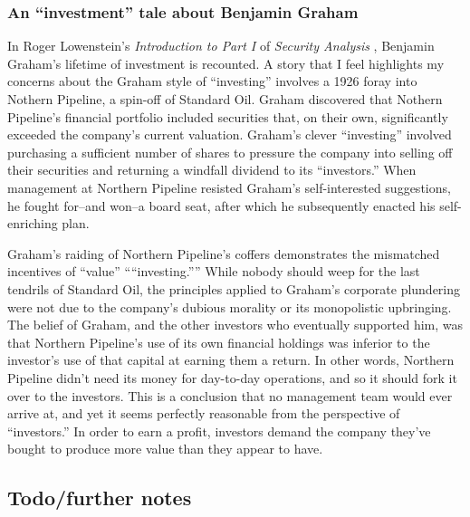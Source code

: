 \subsubsection{An ``investment'' tale about Benjamin Graham}

In Roger Lowenstein's {\it Introduction to Part I} of {\it Security Analysis} \cite{Graham2023}, Benjamin Graham's lifetime of investment is recounted.  A story that I feel highlights my concerns about the Graham style of ``investing'' involves a 1926 foray into Nothern Pipeline, a spin-off of Standard Oil.  Graham discovered that Nothern Pipeline's financial portfolio included securities that, on their own, significantly exceeded the company's current valuation.  Graham's clever ``investing'' involved purchasing a sufficient number of shares to pressure the company into selling off their securities and returning a windfall dividend to its ``investors.''  When management at Northern Pipeline resisted Graham's self-interested suggestions, he fought for--and won--a board seat, after which he subsequently enacted his self-enriching plan.

Graham's raiding of Northern Pipeline's coffers demonstrates the mismatched incentives of ``value'' ````investing.''''  While nobody should weep for the last tendrils of Standard Oil, the principles applied to Graham's corporate plundering were not due to the company's dubious morality or its monopolistic upbringing.  The belief of Graham, and the other investors who eventually supported him, was that Northern Pipeline's use of its own financial holdings was inferior to the investor's use of that capital at earning them a return.  In other words, Northern Pipeline didn't need its money for day-to-day operations, and so it should fork it over to the investors.  This is a conclusion that no management team would ever arrive at, and yet it seems perfectly reasonable from the perspective of ``investors.''  In order to earn a profit, investors demand the company they've bought to produce more value than they appear to have.


\subsection{Todo/further notes}

